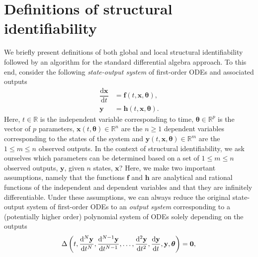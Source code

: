 \documentclass[12pt]{article}
\begin{document}
\section{Definitions of structural identifiability}

We briefly present definitions of both global and local structural identifiability followed by an algorithm for the standard differential algebra approach. To this end, consider the following \emph{state-output system} of first-order ODEs and associated outputs
\begin{equation}
\begin{split}
    \dfrac{\mathrm{d}\mathbf{x}}{\mathrm{d}t}&=\mathbf{f}\left(t,\mathbf{x},\boldsymbol{\theta}\right),\\
    \mathbf{y}&=\mathbf{h}\left(t,\mathbf{x},\boldsymbol{\theta}\right).
    \end{split}
    \label{eq:ODE_sys_full}
\end{equation}
Here, $t\in\mathbb{R}$ is the independent variable corresponding to time, $\boldsymbol{\theta}\in\mathbb{R}^{p}$ is the vector of $p$ parameters, $\mathbf{x}(t,\boldsymbol{\theta})\in\mathbb{R}^{n}$ are the $n\geq1$ dependent variables corresponding to the states of the system and $\mathbf{y}(t,\mathbf{x},\boldsymbol{\theta})\in\mathbb{R}^{m}$ are the $1\leq{m}\leq n$ observed outputs. In the context of structural identifiability, we ask ourselves which parameters can be determined based on a set of $1\leq m\leq n$ observed outputs, $\mathbf{y}$, given $n$ states, $\mathbf{x}$? Here, we make two important assumptions, namely that the functions $\mathbf{f}$ and $\mathbf{h}$ are analytical and rational functions of the independent and dependent variables and that they are infinitely differentiable. Under these assumptions, we can always reduce the original state-output system of first-order ODEs to an \textit{output system} corresponding to a (potentially higher order) polynomial system of ODEs solely depending on the outputs~\cite{ljung1994global}
\begin{equation}
    \Delta\left(t,\frac{\mathrm{d}^{N}\mathbf{y}}{\mathrm{d}t^{N}},\frac{\mathrm{d}^{N-1}\mathbf{y}}{\mathrm{d}t^{N-1}},\ldots,\dfrac{\mathrm{d}^{2}\mathbf{y}}{\mathrm{d}t^{2}},\dfrac{\mathrm{d}\mathbf{y}}{\mathrm{d}t},\mathbf{y},\boldsymbol{\theta}\right)=\mathbf{0},\\
    \label{eq:ODE_sys_output}
\end{equation}
\end{document}
